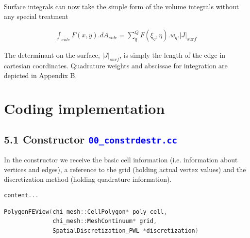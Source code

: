 \documentclass[11pt,letterpaper,titlepage]{article}
\newcommand{\beqn}{\begin{equation}
	\begin{aligned}}
\newcommand{\eeqn}{\end{aligned}
	\end{equation}}
\newcommand{\xmltag}[1]{\textcolor{blue}{ \texttt{#1}} }
\begin{document}
Surface integrals can now take the simple form of the volume integrals without any special treatment

\beqn 
\int_{side} F(x,y).dA_{side} = \sum_q^Q F(\xi_q,\eta).w_q.|J|_{surf}
\eeqn 

The determinant on the surface, $|J|_{surf}$, is simply the length of the edge in cartesian coordinates. Quadrature weights and abscissae for integration are depicted in Appendix B.


\section{Coding implementation}
\subsection{5.1 Constructor \xmltag{00\_constrdestr.cc}}
In the constructor we receive the basic cell information (i.e. information about vertices and edges), a reference to the grid (holding actual vertex values) and the discretization method (holding quadrature information).
\begin{lstlisting}[language=c++]
content...
\end{lstlisting}
\begin{lstlisting}[language=c++]
PolygonFEView(chi_mesh::CellPolygon* poly_cell,
              chi_mesh::MeshContinuum* grid,
              SpatialDiscretization_PWL *discretization)
\end{lstlisting}
\end{document}
